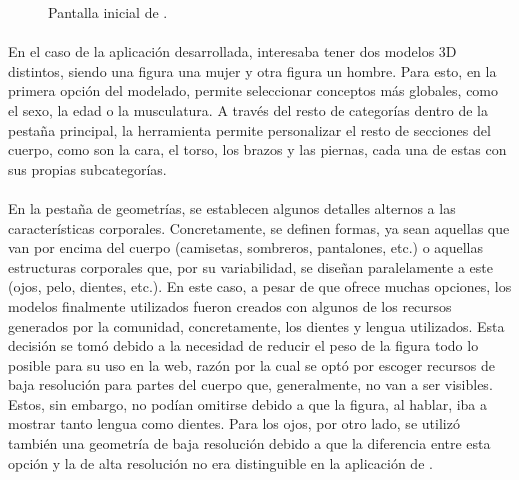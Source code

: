 \documentclass{subfiles}
\begin{document}
    \begin{figure}
    \centering
    \caption{Pantalla inicial de \makehuman.}
    \label{fig:makehuman_landing}
    \end{figure}

    \paragraph{}
    En el caso de la aplicación desarrollada, interesaba tener dos modelos 3D distintos, siendo una figura una mujer y otra figura un hombre. Para esto, en la primera opción del modelado, \makehuman permite seleccionar conceptos más globales, como el sexo, la edad o la musculatura. A través del resto de categorías dentro de la pestaña principal, la herramienta permite personalizar el resto de secciones del cuerpo, como son la cara, el torso, los brazos y las piernas, cada una de estas con sus propias subcategorías.

    \paragraph{}
    En la pestaña de geometrías, se establecen algunos detalles alternos a las características corporales. Concretamente, se definen formas, ya sean aquellas que van por encima del cuerpo (camisetas, sombreros, pantalones, etc.) o aquellas estructuras corporales que, por su variabilidad, se diseñan paralelamente a este (ojos, pelo, dientes, etc.). En este caso, a pesar de que \makehuman ofrece muchas opciones, los modelos finalmente utilizados fueron creados con algunos de los recursos generados por la comunidad, concretamente, los dientes y lengua utilizados. Esta decisión se tomó debido a la necesidad de reducir el peso de la figura todo lo posible para su uso en la web, razón por la cual se optó por escoger recursos de baja resolución para partes del cuerpo que, generalmente, no van a ser visibles. Estos, sin embargo, no podían omitirse debido a que la figura, al hablar, iba a mostrar tanto lengua como dientes. Para los ojos, por otro lado, se utilizó también una geometría de baja resolución debido a que la diferencia entre esta opción y la de alta resolución no era distinguible en la aplicación de \ra.
    
\end{document}

